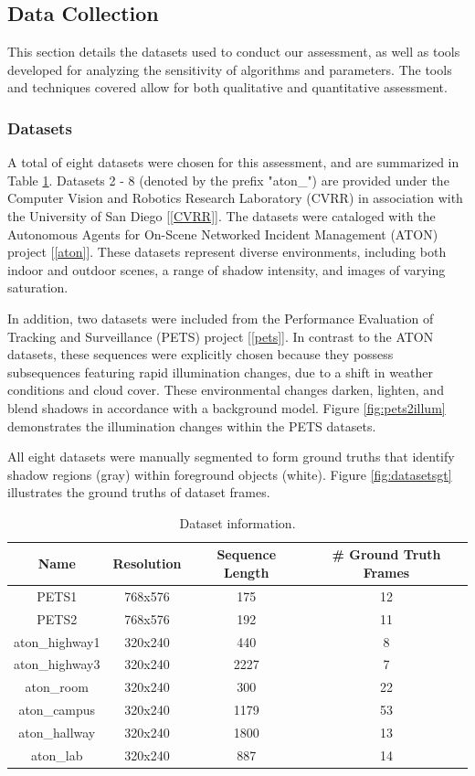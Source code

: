 \subsection{Data Collection}  \label{section:datacollection}

This section details the datasets used to conduct our assessment, as well as tools developed for analyzing the sensitivity of algorithms and parameters. The tools and techniques covered allow for both qualitative and quantitative assessment.

\subsubsection{Datasets}

A total of eight datasets were chosen for this assessment, and are summarized in Table \ref{table:datasets}. Datasets 2 - 8 (denoted by the prefix "aton\_") are provided under the Computer Vision and Robotics Research Laboratory (CVRR) in association with the University of San Diego [\ref{CVRR}]. The datasets were cataloged with the Autonomous Agents for On-Scene Networked Incident Management (ATON) project [\ref{aton}]. These datasets represent diverse environments, including both indoor and outdoor scenes, a range of shadow intensity, and images of varying saturation.

In addition, two datasets were included from the Performance Evaluation of Tracking and Surveillance (PETS) project [\ref{pets}]. In contrast to the ATON datasets, these sequences were explicitly chosen because they possess subsequences featuring rapid illumination changes, due to a shift in weather conditions and cloud cover. These environmental changes darken, lighten, and blend shadows in accordance with a background model. Figure \ref{fig:pets2illum} demonstrates the illumination changes within the PETS datasets.

All eight datasets were manually segmented to form ground truths that identify shadow regions (gray) within foreground objects (white). Figure \ref{fig:datasetsgt} illustrates the ground truths of dataset frames.


\begin{table}
\centering
\begin{tabular}{ |c|c|c|c| }
	\hline
	\textbf{Name} & \textbf{Resolution} & \textbf{Sequence Length} & \textbf{\# Ground Truth Frames} \\
	\hline
	\hline
	PETS1 & 768x576 & 175 & 12 \\
	\hline
	PETS2 & 768x576 & 192 & 11 \\
	\hline
	aton\_highway1 & 320x240 & 440 & 8 \\
	\hline 
	aton\_highway3 & 320x240 & 2227 & 7 \\ 
	\hline
	aton\_room & 320x240 & 300 & 22 \\ 
	\hline
	aton\_campus & 320x240 & 1179 & 53 \\ 
	\hline
	aton\_hallway & 320x240 & 1800 & 13 \\
	\hline
	aton\_lab & 320x240 & 887 & 14 \\ 
	\hline
\end{tabular} \label{table:datasets}
\caption{Dataset information.}
\end{table}

